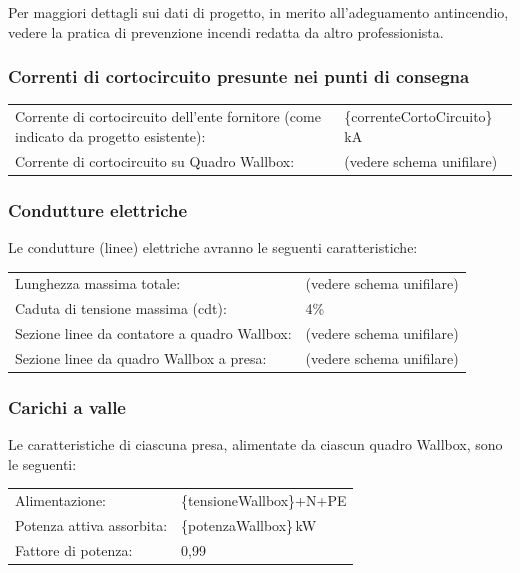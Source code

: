 Per maggiori dettagli sui dati di progetto, in merito all’adeguamento antincendio, vedere la pratica di prevenzione incendi redatta da altro professionista.    

\subsubsection{Correnti di cortocircuito presunte nei punti di consegna }
\begin{center}
\begin{tabularx}{\textwidth}{lX}
Corrente di cortocircuito dell'ente fornitore (come indicato da progetto esistente): & \{correnteCortoCircuito\}\,kA \\
Corrente di cortocircuito su Quadro Wallbox: & (vedere schema unifilare) \\
\end{tabularx}
\end{center}


\subsubsection{Condutture elettriche}
Le condutture (linee) elettriche avranno le seguenti caratteristiche:

\begin{center}
\begin{tabularx}{\textwidth}{lX}
Lunghezza massima totale:                    & (vedere schema unifilare) \\
Caduta di tensione massima (cdt):            & 4\% \\
Sezione linee da contatore a quadro Wallbox: & (vedere schema unifilare) \\
Sezione linee da quadro Wallbox a presa:      & (vedere schema unifilare) \\
\end{tabularx}
\end{center}

\subsubsection{Carichi a valle}
Le caratteristiche di ciascuna presa, alimentate da ciascun quadro Wallbox, sono le seguenti:

\begin{center}
\begin{tabularx}{\textwidth}{lX}
Alimentazione:           & \{tensioneWallbox\}+N+PE \\
Potenza attiva assorbita: & \{potenzaWallbox\}\,kW \\
Fattore di potenza:       & 0,99 \\
\end{tabularx}
\end{center}




